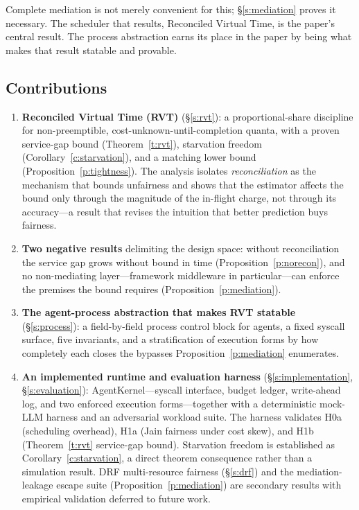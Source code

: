 \documentclass[letterpaper,11pt,leqno]{article}
\begin{document}
Complete mediation is not merely convenient for this; \S\ref{s:mediation} proves it necessary. The scheduler that results, Reconciled Virtual Time, is the paper's central result. The process abstraction earns its place in the paper by being what makes that result statable and provable.

\subsection{Contributions}\label{s:contributions}

\begin{enumerate}
\item \textbf{Reconciled Virtual Time (RVT)} (\S\ref{s:rvt}): a proportional-share discipline for non-preemptible, cost-unknown-until-completion quanta, with a proven service-gap bound (Theorem~\ref{t:rvt}), starvation freedom (Corollary~\ref{c:starvation}), and a matching lower bound (Proposition~\ref{p:tightness}). The analysis isolates \emph{reconciliation} as the mechanism that bounds unfairness and shows that the estimator affects the bound only through the magnitude of the in-flight charge, not through its accuracy---a result that revises the intuition that better prediction buys fairness.
\item \textbf{Two negative results} delimiting the design space: without reconciliation the service gap grows without bound in time (Proposition~\ref{p:norecon}), and no non-mediating layer---framework middleware in particular---can enforce the premises the bound requires (Proposition~\ref{p:mediation}).
\item \textbf{The agent-process abstraction that makes RVT statable} (\S\ref{s:process}): a field-by-field process control block for agents, a fixed syscall surface, five invariants, and a stratification of execution forms by how completely each closes the bypasses Proposition~\ref{p:mediation} enumerates.
\item \textbf{An implemented runtime and evaluation harness} (\S\ref{s:implementation}, \S\ref{s:evaluation}): AgentKernel---syscall interface, budget ledger, write-ahead log, and two enforced execution forms---together with a deterministic mock-LLM harness and an adversarial workload suite. The harness validates H0a (scheduling overhead), H1a (Jain fairness under cost skew), and H1b (Theorem~\ref{t:rvt} service-gap bound). Starvation freedom is established as Corollary~\ref{c:starvation}, a direct theorem consequence rather than a simulation result. DRF multi-resource fairness (\S\ref{s:drf}) and the mediation-leakage escape suite (Proposition~\ref{p:mediation}) are secondary results with empirical validation deferred to future work.
\end{enumerate}
\end{document}
